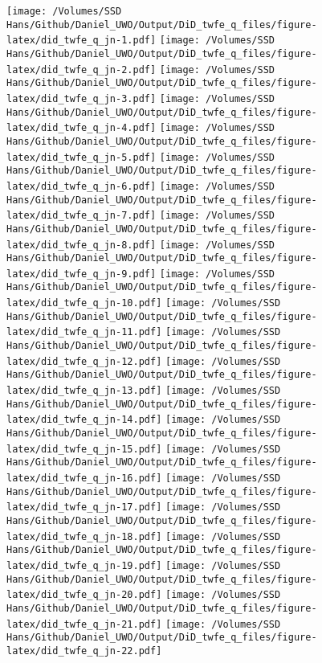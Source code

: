 \documentclass[
]{article}
\begin{document}
\texttt{[image: /Volumes/SSD Hans/Github/Daniel\_UWO/Output/DiD\_twfe\_q\_files/figure-latex/did\_twfe\_q\_jn-1.pdf]}
\texttt{[image: /Volumes/SSD Hans/Github/Daniel\_UWO/Output/DiD\_twfe\_q\_files/figure-latex/did\_twfe\_q\_jn-2.pdf]}
\texttt{[image: /Volumes/SSD Hans/Github/Daniel\_UWO/Output/DiD\_twfe\_q\_files/figure-latex/did\_twfe\_q\_jn-3.pdf]}
\texttt{[image: /Volumes/SSD Hans/Github/Daniel\_UWO/Output/DiD\_twfe\_q\_files/figure-latex/did\_twfe\_q\_jn-4.pdf]}
\texttt{[image: /Volumes/SSD Hans/Github/Daniel\_UWO/Output/DiD\_twfe\_q\_files/figure-latex/did\_twfe\_q\_jn-5.pdf]}
\texttt{[image: /Volumes/SSD Hans/Github/Daniel\_UWO/Output/DiD\_twfe\_q\_files/figure-latex/did\_twfe\_q\_jn-6.pdf]}
\texttt{[image: /Volumes/SSD Hans/Github/Daniel\_UWO/Output/DiD\_twfe\_q\_files/figure-latex/did\_twfe\_q\_jn-7.pdf]}
\texttt{[image: /Volumes/SSD Hans/Github/Daniel\_UWO/Output/DiD\_twfe\_q\_files/figure-latex/did\_twfe\_q\_jn-8.pdf]}
\texttt{[image: /Volumes/SSD Hans/Github/Daniel\_UWO/Output/DiD\_twfe\_q\_files/figure-latex/did\_twfe\_q\_jn-9.pdf]}
\texttt{[image: /Volumes/SSD Hans/Github/Daniel\_UWO/Output/DiD\_twfe\_q\_files/figure-latex/did\_twfe\_q\_jn-10.pdf]}
\texttt{[image: /Volumes/SSD Hans/Github/Daniel\_UWO/Output/DiD\_twfe\_q\_files/figure-latex/did\_twfe\_q\_jn-11.pdf]}
\texttt{[image: /Volumes/SSD Hans/Github/Daniel\_UWO/Output/DiD\_twfe\_q\_files/figure-latex/did\_twfe\_q\_jn-12.pdf]}
\texttt{[image: /Volumes/SSD Hans/Github/Daniel\_UWO/Output/DiD\_twfe\_q\_files/figure-latex/did\_twfe\_q\_jn-13.pdf]}
\texttt{[image: /Volumes/SSD Hans/Github/Daniel\_UWO/Output/DiD\_twfe\_q\_files/figure-latex/did\_twfe\_q\_jn-14.pdf]}
\texttt{[image: /Volumes/SSD Hans/Github/Daniel\_UWO/Output/DiD\_twfe\_q\_files/figure-latex/did\_twfe\_q\_jn-15.pdf]}
\texttt{[image: /Volumes/SSD Hans/Github/Daniel\_UWO/Output/DiD\_twfe\_q\_files/figure-latex/did\_twfe\_q\_jn-16.pdf]}
\texttt{[image: /Volumes/SSD Hans/Github/Daniel\_UWO/Output/DiD\_twfe\_q\_files/figure-latex/did\_twfe\_q\_jn-17.pdf]}
\texttt{[image: /Volumes/SSD Hans/Github/Daniel\_UWO/Output/DiD\_twfe\_q\_files/figure-latex/did\_twfe\_q\_jn-18.pdf]}
\texttt{[image: /Volumes/SSD Hans/Github/Daniel\_UWO/Output/DiD\_twfe\_q\_files/figure-latex/did\_twfe\_q\_jn-19.pdf]}
\texttt{[image: /Volumes/SSD Hans/Github/Daniel\_UWO/Output/DiD\_twfe\_q\_files/figure-latex/did\_twfe\_q\_jn-20.pdf]}
\texttt{[image: /Volumes/SSD Hans/Github/Daniel\_UWO/Output/DiD\_twfe\_q\_files/figure-latex/did\_twfe\_q\_jn-21.pdf]}
\texttt{[image: /Volumes/SSD Hans/Github/Daniel\_UWO/Output/DiD\_twfe\_q\_files/figure-latex/did\_twfe\_q\_jn-22.pdf]}
\end{document}
